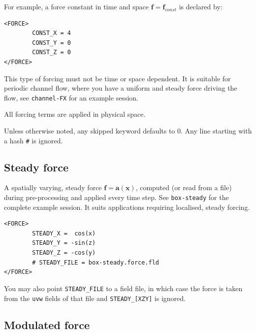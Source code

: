 \documentclass[11pt]{report}
\begin{document}
\noindent For example, a force constant in time and space $\bm{f} =
\bm{f}_{const}$ is declared by:
\begin{verbatim}
<FORCE>
        CONST_X = 4
        CONST_Y = 0
        CONST_Z = 0
</FORCE>
\end{verbatim}
This type of forcing must not be time or space dependent. It is suitable
for periodic channel flow, where you have a uniform and steady force
driving the flow, see \verb+channel-FX+ for an example session.

All forcing terms are applied in physical space.

Unless otherwise noted, any skipped keyword defaults to 0. Any line
starting with a hash \verb+#+ is ignored.

\subsection{Steady force}
\label{sec.steady}

A spatially varying, steady force $\bm{f} = \bm{a}(\bm{x})$, computed
(or read from a file) during pre-processing and applied every time
step. See \verb|box-steady| for the complete example session. It suits
applications requiring localised, steady forcing.
\begin{verbatim}
<FORCE>
        STEADY_X =  cos(x)
        STEADY_Y = -sin(z)
        STEADY_Z = -cos(y)
        # STEADY_FILE = box-steady.force.fld
</FORCE>
\end{verbatim}

You may also point \verb+STEADY_FILE+ to a field file, in which case
the force is taken from the \verb+uvw+ fields of that file and
\verb+STEADY_[XZY]+ is ignored.

\subsection{Modulated force}
\end{document}
